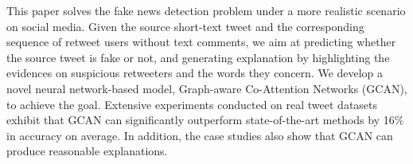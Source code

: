 This paper solves the fake news detection problem under a more realistic scenario on social media. Given the source short-text tweet and the corresponding sequence of retweet users without text comments, we aim at predicting whether the source tweet is fake or not, and generating explanation by highlighting the evidences on suspicious retweeters and the words they concern. We develop a novel neural network-based model, Graph-aware Co-Attention Networks (GCAN), to achieve the goal. Extensive experiments conducted on real tweet datasets exhibit that GCAN can significantly outperform state-of-the-art methods by 16\% in accuracy on average. In addition, the case studies also show that GCAN can produce reasonable explanations.
